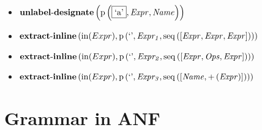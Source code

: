 {\begin{itemize}
\item $\mathbf{unlabel\text{-}designate}\\\left(\mathrm{p}\left(\fbox{\text{`a'}},\mathit{Expr},\mathit{Name}\right)\right)$
\item $\mathbf{extract\text{-}inline}\left(\mathrm{in}(Expr),\\\mathrm{p}\left(\text{`'},\mathit{Expr_1},\mathrm{seq}\left(\left[\mathit{Expr}, \mathit{Expr}, \mathit{Expr}\right]\right)\right)\right)$
\item $\mathbf{extract\text{-}inline}\left(\mathrm{in}(Expr),\\\mathrm{p}\left(\text{`'},\mathit{Expr_2},\mathrm{seq}\left(\left[\mathit{Expr}, \mathit{Ops}, \mathit{Expr}\right]\right)\right)\right)$
\item $\mathbf{extract\text{-}inline}\left(\mathrm{in}(Expr),\\\mathrm{p}\left(\text{`'},\mathit{Expr_3},\mathrm{seq}\left(\left[\mathit{Name}, {+}\left(\mathit{Expr}\right)\right]\right)\right)\right)$
\end{itemize}}

\section{Grammar in ANF}

